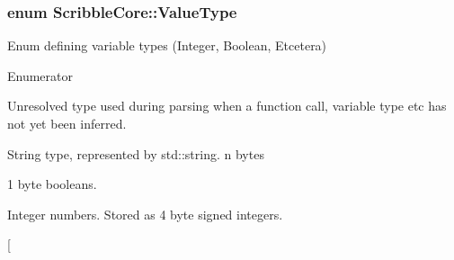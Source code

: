 \hypertarget{namespace_scribble_core_a0727ed627ce26b81336440a5edecebfb}{
\subsubsection[{Value\-Type}]{\setlength{\rightskip}{0pt plus 5cm}enum {\bf Scribble\-Core\-::\-Value\-Type}}}\label{namespace_scribble_core_a0727ed627ce26b81336440a5edecebfb}
Enum defining variable types (Integer, Boolean, Etcetera) \begin{Desc}
\item[Enumerator]\par
\begin{description}
\item[{\em 
\hypertarget{namespace_scribble_core_a0727ed627ce26b81336440a5edecebfbab62211a9221c21df99df729b97818801}{Type\-Unresolved}\label{namespace_scribble_core_a0727ed627ce26b81336440a5edecebfbab62211a9221c21df99df729b97818801}
}]Unresolved type used during parsing when a function call, variable type etc has not yet been inferred. \item[{\em 
\hypertarget{namespace_scribble_core_a0727ed627ce26b81336440a5edecebfba6a7016ba8c53acda738f0cb44a460843}{String\-Type}\label{namespace_scribble_core_a0727ed627ce26b81336440a5edecebfba6a7016ba8c53acda738f0cb44a460843}
}]String type, represented by std\-::string. n bytes \item[{\em 
\hypertarget{namespace_scribble_core_a0727ed627ce26b81336440a5edecebfba8b7e7025f1705f5b8d45e25cee87d8a0}{Boolean}\label{namespace_scribble_core_a0727ed627ce26b81336440a5edecebfba8b7e7025f1705f5b8d45e25cee87d8a0}
}]1 byte booleans. \item[{\em 
\hypertarget{namespace_scribble_core_a0727ed627ce26b81336440a5edecebfba360e5e02b8f31a7e682d9ec7eeacad02}{Int}\label{namespace_scribble_core_a0727ed627ce26b81336440a5edecebfba360e5e02b8f31a7e682d9ec7eeacad02}
}]Integer numbers. Stored as 4 byte signed integers. \item[{\em 
}
\end{description}
\end{Desc}
